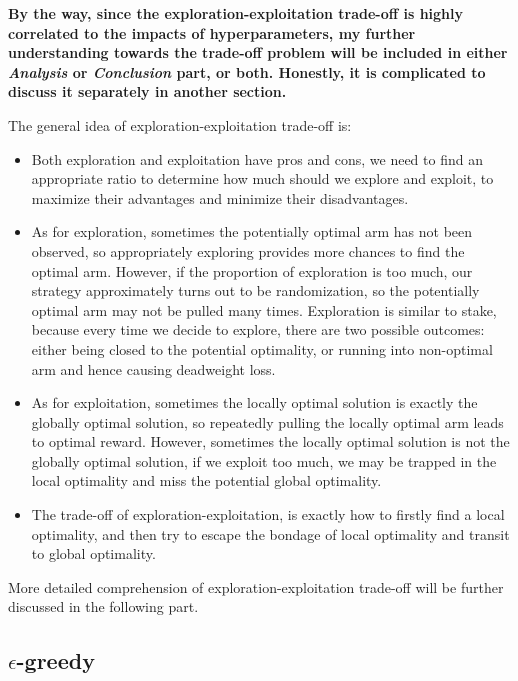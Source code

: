 \documentclass[11pt]{article}
\begin{document}
\textbf{By the way, since the exploration-exploitation trade-off is
highly correlated to the impacts of hyperparameters, my further
understanding towards the trade-off problem will be included in either
\emph{Analysis} or \emph{Conclusion} part, or both. Honestly, it is
complicated to discuss it separately in another section.}

The general idea of exploration-exploitation trade-off is:

\begin{itemize}
\item
  Both exploration and exploitation have pros and cons, we need to find
  an appropriate ratio to determine how much should we explore and
  exploit, to maximize their advantages and minimize their
  disadvantages.
\item
  As for exploration, sometimes the potentially optimal arm has not been
  observed, so appropriately exploring provides more chances to find the
  optimal arm. However, if the proportion of exploration is too much,
  our strategy approximately turns out to be randomization, so the
  potentially optimal arm may not be pulled many times. Exploration is
  similar to stake, because every time we decide to explore, there are
  two possible outcomes: either being closed to the potential
  optimality, or running into non-optimal arm and hence causing
  deadweight loss.
\item
  As for exploitation, sometimes the locally optimal solution is exactly
  the globally optimal solution, so repeatedly pulling the locally
  optimal arm leads to optimal reward. However, sometimes the locally
  optimal solution is not the globally optimal solution, if we exploit
  too much, we may be trapped in the local optimality and miss the
  potential global optimality.
\item
  The trade-off of exploration-exploitation, is exactly how to firstly
  find a local optimality, and then try to escape the bondage of local
  optimality and transit to global optimality.
\end{itemize}

More detailed comprehension of exploration-exploitation trade-off will
be further discussed in the following part.

    \hypertarget{epsilon-greedy}{%
\subsection{\texorpdfstring{\(\epsilon\)-greedy}{\textbackslash epsilon-greedy}}\label{epsilon-greedy}}
\end{document}
